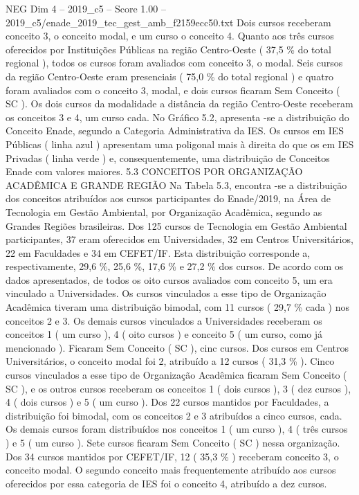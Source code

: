\begin{textsample}{NEG Dim 4 – 2019\_c5 – Score 1.00 – 2019\_c5/enade\_2019\_tec\_gest\_amb\_f2159ecc50.txt}
Dois cursos receberam conceito 3, o conceito modal, e um curso o conceito 4.
Quanto aos três cursos oferecidos por Instituições Públicas na região Centro-Oeste ( 37,5 \% do total regional ), todos os cursos foram avaliados com conceito 3, o modal.
Seis cursos da região Centro-Oeste eram presenciais ( 75,0 \% do total regional ) e quatro foram avaliados com o conceito 3, modal, e dois cursos ficaram Sem Conceito ( SC ).
Os dois cursos da modalidade a distância da região Centro-Oeste receberam os conceitos 3 e 4, um curso cada.
No Gráfico 5.2, apresenta -se a distribuição do Conceito Enade, segundo a Categoria Administrativa da IES.
Os cursos em IES Públicas ( linha azul ) apresentam uma poligonal mais à direita do que os em IES Privadas ( linha verde ) e, consequentemente, uma distribuição de Conceitos Enade com valores maiores. 5.3 CONCEITOS POR ORGANIZAÇÃO ACADÊMICA E GRANDE REGIÃO Na Tabela 5.3, encontra -se a distribuição dos conceitos atribuídos aos cursos participantes do Enade/2019, na Área de Tecnologia em Gestão Ambiental, por Organização Acadêmica, segundo as Grandes Regiões brasileiras.
Dos 125 cursos de Tecnologia em Gestão Ambiental participantes, 37 eram oferecidos em Universidades, 32 em Centros Universitários, 22 em Faculdades e 34 em CEFET/IF.
Esta distribuição corresponde a, respectivamente, 29,6 \%, 25,6 \%, 17,6 \% e 27,2 \% dos cursos.
De acordo com os dados apresentados, de todos os oito cursos avaliados com conceito 5, um era vinculado a Universidades.
Os cursos vinculados a esse tipo de Organização Acadêmica tiveram uma distribuição bimodal, com 11 cursos ( 29,7 \% cada ) nos conceitos 2 e 3.
Os demais cursos vinculados a Universidades receberam os conceitos 1 ( um curso ), 4 ( oito cursos ) e conceito 5 ( um curso, como já mencionado ).
Ficaram Sem Conceito ( SC ), cinc cursos.
Dos cursos em Centros Universitários, o conceito modal foi 2, atribuído a 12 cursos ( 31,3 \% ).
Cinco cursos vinculados a esse tipo de Organização Acadêmica ficaram Sem Conceito ( SC ), e os outros cursos receberam os conceitos 1 ( dois cursos ), 3 ( dez cursos ), 4 ( dois cursos ) e 5 ( um curso ).
Dos 22 cursos mantidos por Faculdades, a distribuição foi bimodal, com os conceitos 2 e 3 atribuídos a cinco cursos, cada.
Os demais cursos foram distribuídos nos conceitos 1 ( um curso ), 4 ( três cursos ) e 5 ( um curso ).
Sete cursos ficaram Sem Conceito ( SC ) nessa organização.
Dos 34 cursos mantidos por CEFET/IF, 12 ( 35,3 \% ) receberam conceito 3, o conceito modal.
O segundo conceito mais frequentemente atribuído aos cursos oferecidos por essa categoria de IES foi o conceito 4, atribuído a dez cursos.

\end{textsample}
